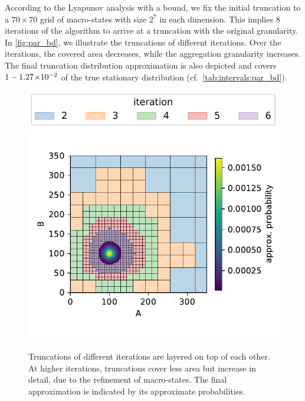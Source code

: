 According to the Lyapunov analysis with a  bound, we fix the
initial truncation to a $70\times 70$ grid of macro-states with size
$2^7$ in each dimension.
This implies 8 iterations of the algorithm to arrive at a truncation
with the original granularity.
In \autoref{fig:par_bd}, we illustrate the truncations of different iterations.
Over the iterations, the covered area decreases, while the
aggregation granularity increases.
The final truncation distribution approximation is also depicted and
covers $1 -  1.27\!\times\hspace{-.5ex} 10^{-2} $ of the true stationary distribution
(cf.\ \autoref{tab:intervals:par_bd}).
\begin{figure}[htb]
  \centering
  \includegraphics[scale=0.7]{gfx/iteration_legend.pdf}\\
  \vspace{-5mm}
  \includegraphics[width=.75\textwidth]{gfx/parbd_truncs.pdf}
  \caption[Overview of truncation
  refinements]{\label{fig:par_bd}Truncations of different iterations
    are layered on top of each other. At higher iterations, truncations
    cover less area but increase in detail, due to the refinement of
    macro-states. The final approximation is indicated by its
  approximate probabilities.}
\end{figure}
